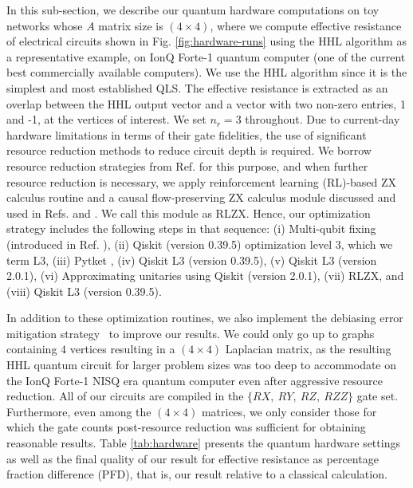 \documentclass[%
 reprint,
 superscriptaddress,
 amsmath,amssymb,
 aps,
 pra,
floatfix,
nofootinbib,
]{revtex4-2}
\theoremstyle{definition}
\theoremstyle{remark}
\begin{document}
In this sub-section, we describe our quantum hardware computations on toy networks whose $A$ matrix size is $(4 \times 4)$, where we compute effective resistance of electrical circuits shown in Fig. \ref{fig:hardware-runs} using the HHL algorithm as a representative example, on IonQ Forte-1 quantum computer (one of the current best commercially available computers). We use the HHL algorithm since it is the simplest and most established QLS. The effective resistance is extracted as an overlap between the HHL output vector and a vector with two non-zero entries, 1 and -1, at the vertices of interest. We set $n_r=3$ throughout. Due to current-day hardware limitations in terms of their gate fidelities, the use of significant resource reduction methods to reduce circuit depth is required. We borrow resource reduction strategies from Ref. \cite{nishanth2023adapt} for this purpose, and when further resource reduction is necessary, we apply reinforcement learning (RL)-based ZX calculus routine and a causal flow-preserving ZX calculus module discussed and used in Refs. \cite{riu2024reinforcement} and \cite{Palak2025relvqe}. We call this module as RLZX. Hence, our optimization strategy includes the following steps in that sequence: (i) Multi-qubit fixing (introduced in Ref. \cite{nishanth2023adapt}), (ii) Qiskit (version 0.39.5) \cite{Qiskit2021} optimization level 3, which we term L3, (iii) Pytket \cite{Sivarajah2021tket}, (iv) Qiskit L3 (version 0.39.5), (v)  Qiskit L3 (version 2.0.1), (vi) Approximating unitaries using Qiskit (version 2.0.1), (vii) RLZX, and (viii) Qiskit L3 (version 0.39.5). 

In addition to these optimization routines, we also implement the debiasing error mitigation strategy~\cite{maksymov2023symmetry} to improve our results. We could only go up to graphs containing $4$ vertices resulting in a $(4 \times 4)$ Laplacian matrix, as the resulting HHL quantum circuit for larger problem sizes was too deep to accommodate on the IonQ Forte-1 NISQ era quantum computer even after aggressive resource reduction. All of our circuits are compiled in the $\{RX,\ RY,\ RZ,\ RZZ\}$ gate set. Furthermore, even among the $(4 \times 4)$ matrices, we only consider those for which the gate counts post-resource reduction was sufficient for obtaining reasonable results. Table \ref{tab:hardware} presents the quantum hardware settings as well as the final quality of our result for effective resistance as percentage fraction difference (PFD), that is, our result relative to a classical calculation. \\ 
\end{document}
